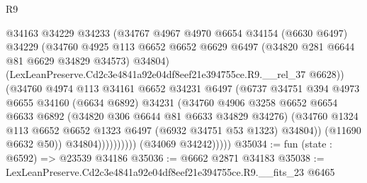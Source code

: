 \begin{lexlean}{R9}
\begin{coremodule}
                              @34163
                              @34229
                              @34233
                              (@34767
                                @4967
                                @4970
                                @6654
                                @34154
                                (@6630 @6497)
                                @34229
                                (@34760
                                  @4925
                                  @113
                                  @6652
                                  @6652
                                  @6629
                                  @6497
                                  (@34820 @281 @6644 @81 @6629 @34829 @34573)
                                  @34804)
                                (LexLeanPreserve.Cd2c3e4841a92e04df8eef21e394755ce.R9.__rel_37
                                  @6628))
                              (@34760
                                @4974
                                @113
                                @34161
                                @6652
                                @34231
                                @6497
                                (@6737
                                  @34751
                                  @394
                                  @4973
                                  @6655
                                  @34160
                                  (@6634 @6892)
                                  @34231
                                  (@34760
                                    @4906
                                    @3258
                                    @6652
                                    @6654
                                    @6633
                                    @6892
                                    (@34820 @306 @6644 @81 @6633 @34829 @34276)
                                    (@34760
                                      @1324
                                      @113
                                      @6652
                                      @6652
                                      @1323
                                      @6497
                                      (@6932 @34751 @53 @1323)
                                      @34804))
                                  (@11690 @6632 @50))
                                @34804))))))))))
            (@34069 @34242)))))
@35034 := fun (state : @6592) => @23539 @34186
@35036 := @6662 @2871 @34183
@35038 := LexLeanPreserve.Cd2c3e4841a92e04df8eef21e394755ce.R9.__fits_23 @6465

\end{coremodule}
\end{lexlean}
